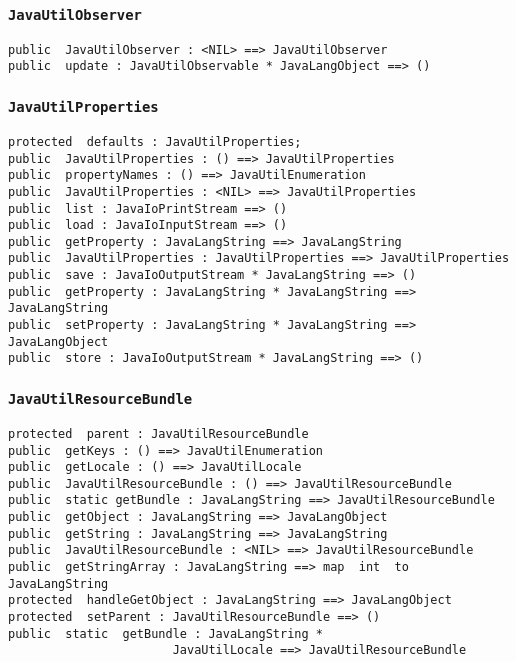 \documentclass[\pformat,12pt]{article}
\begin{document}
\subsubsection{\texttt{JavaUtilObserver}}
\begin{small}
\begin{verbatim}
public  JavaUtilObserver : <NIL> ==> JavaUtilObserver
public  update : JavaUtilObservable * JavaLangObject ==> ()
\end{verbatim}
\end{small}

\subsubsection{\texttt{JavaUtilProperties}}
\begin{small}
\begin{verbatim}
protected  defaults : JavaUtilProperties;
public  JavaUtilProperties : () ==> JavaUtilProperties
public  propertyNames : () ==> JavaUtilEnumeration
public  JavaUtilProperties : <NIL> ==> JavaUtilProperties
public  list : JavaIoPrintStream ==> ()
public  load : JavaIoInputStream ==> ()
public  getProperty : JavaLangString ==> JavaLangString
public  JavaUtilProperties : JavaUtilProperties ==> JavaUtilProperties
public  save : JavaIoOutputStream * JavaLangString ==> ()
public  getProperty : JavaLangString * JavaLangString ==> JavaLangString
public  setProperty : JavaLangString * JavaLangString ==> JavaLangObject
public  store : JavaIoOutputStream * JavaLangString ==> ()
\end{verbatim}
\end{small}

\subsubsection{\texttt{JavaUtilResourceBundle}}
\begin{small}
\begin{verbatim}
protected  parent : JavaUtilResourceBundle
public  getKeys : () ==> JavaUtilEnumeration
public  getLocale : () ==> JavaUtilLocale
public  JavaUtilResourceBundle : () ==> JavaUtilResourceBundle
public  static getBundle : JavaLangString ==> JavaUtilResourceBundle
public  getObject : JavaLangString ==> JavaLangObject
public  getString : JavaLangString ==> JavaLangString
public  JavaUtilResourceBundle : <NIL> ==> JavaUtilResourceBundle
public  getStringArray : JavaLangString ==> map  int  to  JavaLangString
protected  handleGetObject : JavaLangString ==> JavaLangObject
protected  setParent : JavaUtilResourceBundle ==> ()
public  static  getBundle : JavaLangString * 
                       JavaUtilLocale ==> JavaUtilResourceBundle
\end{verbatim}
\end{small}
\end{document}
